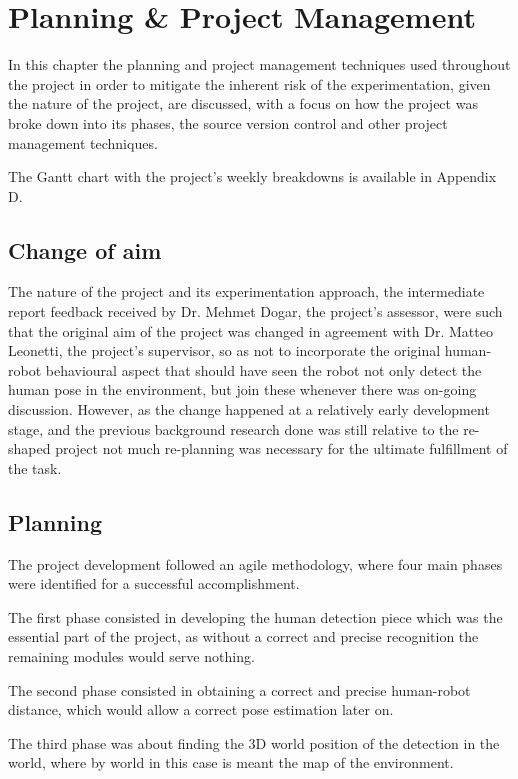 \chapter{Planning \& Project Management}
\label{chapter8}

In this chapter the planning and project management techniques used throughout the project in order to mitigate the inherent risk of the experimentation, given the nature of the project, are discussed, with a focus on how the project was broke down into its phases, the source version control and other project management techniques.

The Gantt chart with the project's weekly breakdowns is available in Appendix D.

\section{Change of aim}

The nature of the project and its experimentation approach, the intermediate report feedback received by Dr. Mehmet Dogar, the project's assessor, were such that the original aim of the project was changed in agreement with Dr. Matteo Leonetti, the project's supervisor, so as not to incorporate the original human-robot behavioural aspect that should have seen the robot not only detect the human pose in the environment, but join these whenever there was on-going discussion. However, as the change happened at a relatively early development stage, and the previous background research done was still relative to the re-shaped project not much re-planning was necessary for the ultimate fulfillment of the task.

\section{Planning}

The project development followed an agile methodology, where four main phases were identified for a successful accomplishment.

The first phase consisted in developing the human detection piece which was the essential part of the project, as without a correct and precise recognition the remaining modules would serve nothing.

The second phase consisted in obtaining a correct and precise human-robot distance, which would allow a correct pose estimation later on.

The third phase was about finding the 3D world position of the detection in the world, where by world in this case is meant the map of the environment.

